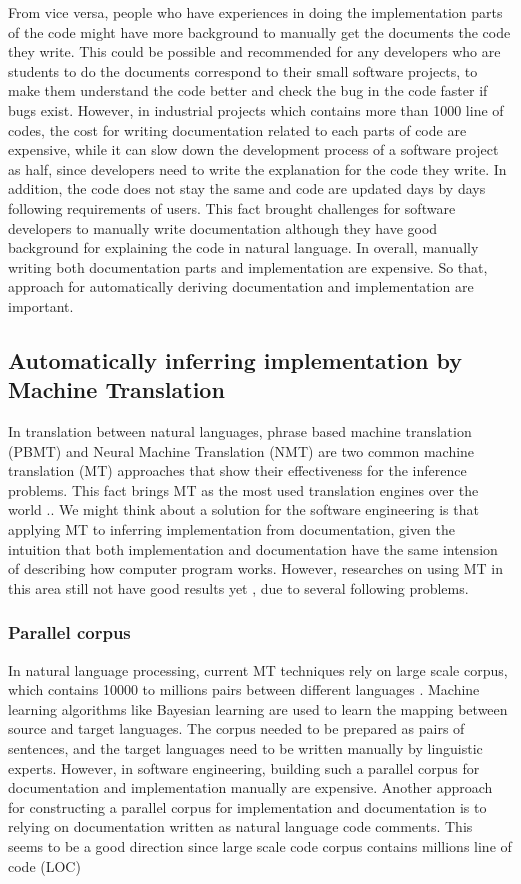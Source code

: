 From vice versa, people who have experiences in doing the implementation parts of the code might have more background to manually get the documents the code they write. This could be possible and recommended for any developers who are students to do the documents correspond to their small software projects, to make them understand the code better and check the bug in the code faster if bugs exist. However, in industrial projects which contains more than 1000 line of codes, the cost for writing documentation related to each parts of code are expensive, while it can slow down the development process of a software project as half, since developers need to write the explanation for the code they write. In addition, the code does not stay the same and code are updated days by days following requirements of users. This fact brought challenges for software developers to manually write documentation although they have good background for explaining the code in natural language. In overall, manually writing both documentation parts and implementation  are expensive. So that, approach for automatically deriving documentation and implementation are important.

\subsection{Automatically  inferring implementation by Machine Translation }
 In translation between natural languages, phrase based machine translation (PBMT) and Neural Machine Translation (NMT) are two common machine translation (MT) approaches that show their effectiveness for the inference problems. This fact brings MT as the most used translation engines over the world \cite{}.. We might think about a solution for the software engineering is that applying MT to inferring implementation from documentation, given the intuition that both implementation and documentation have the same intension of describing how computer program works. However, researches on using MT in this area still not have good results yet \cite{}, due to several following problems.
\subsubsection{Parallel corpus}
In natural language processing, current MT techniques rely on large scale corpus, which contains 10000 to millions pairs between different languages \cite{}. Machine learning algorithms like Bayesian learning are used to learn the mapping between source and target  languages. The corpus needed to be prepared as pairs of sentences, and the target languages need to be written manually by linguistic experts. However, in software engineering, building such a parallel corpus for documentation and implementation manually are expensive. 
Another approach for constructing a parallel corpus for implementation and documentation is to relying on documentation written as natural language code comments. This seems to be a good direction since large scale code corpus contains millions line of code (LOC) 

